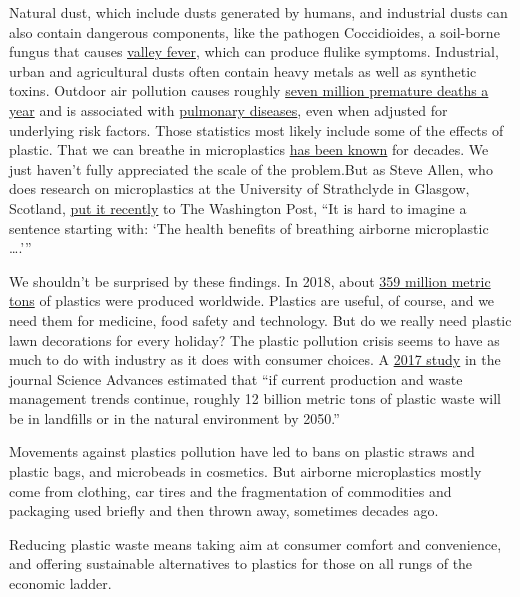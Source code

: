 Natural dust, which include dusts generated by humans, and industrial
dusts can also contain dangerous components, like the pathogen
Coccidioides, a soil-borne fungus that causes
\href{https://www.mayoclinic.org/diseases-conditions/valley-fever/symptoms-causes/syc-20378761}{valley
fever}, which can produce flulike symptoms. Industrial, urban and
agricultural dusts often contain heavy metals as well as synthetic
toxins. Outdoor air pollution causes roughly
\href{https://www.who.int/mediacentre/news/releases/2014/air-pollution/en/}{seven
million premature deaths a year} and is associated with
\href{https://www.nejm.org/doi/full/10.1056/NEJM199312093292401}{pulmonary
diseases}, even when adjusted for underlying risk factors. Those
statistics most likely include some of the effects of plastic. That we
can breathe in microplastics
\href{https://cebp.aacrjournals.org/content/cebp/7/5/419.full.pdf}{has
been known} for decades. We just haven't fully appreciated the scale of
the problem.But as Steve Allen, who does research on microplastics at
the University of Strathclyde in Glasgow, Scotland,
\href{https://www.washingtonpost.com/weather/2020/06/14/national-parks-deep-sea-plastic-pollution-is-showing-up-wherever-scientists-look/}{put
it recently} to The Washington Post, ``It is hard to imagine a sentence
starting with: `The health benefits of breathing airborne microplastic
\ldots.'''

We shouldn't be surprised by these findings. In 2018, about
\href{https://www.statista.com/statistics/282732/global-production-of-plastics-since-1950/}{359
million metric tons} of plastics were produced worldwide. Plastics are
useful, of course, and we need them for medicine, food safety and
technology. But do we really need plastic lawn decorations for every
holiday? The plastic pollution crisis seems to have as much to do with
industry as it does with consumer choices. A
\href{https://advances.sciencemag.org/content/3/7/e1700782.full}{2017
study} in the journal Science Advances estimated that ``if current
production and waste management trends continue, roughly 12 billion
metric tons of plastic waste will be in landfills or in the natural
environment by 2050.''

Movements against plastics pollution have led to bans on plastic straws
and plastic bags, and microbeads in cosmetics. But airborne
microplastics mostly come from clothing, car tires and the fragmentation
of commodities and packaging used briefly and then thrown away,
sometimes decades ago.

Reducing plastic waste means taking aim at consumer comfort and
convenience, and offering sustainable alternatives to plastics for those
on all rungs of the economic ladder.

